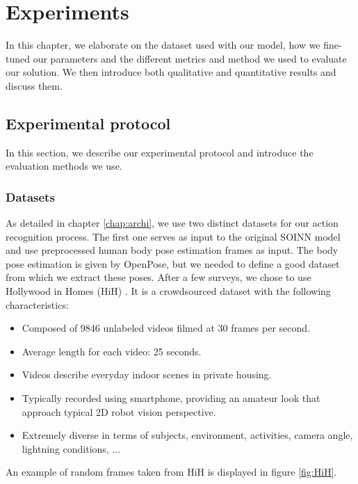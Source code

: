 \chapter{Experiments}
\label{chap:experiments}
In this chapter, we elaborate on the dataset used with our model, how we fine-tuned our parameters and the different metrics and method we used to evaluate our solution. We then introduce both qualitative and quantitative results and discuss them.

\section{Experimental protocol}
\label{section:protocol}
In this section, we describe our experimental protocol and introduce the evaluation methods we use.

\subsection{Datasets}
As detailed in chapter \ref{chap:archi}, we use two distinct datasets for our action recognition process. The first one serves as input to the original SOINN model and use preprocessed human body pose estimation frames as input. The body pose estimation is given by OpenPose, but we needed to define a good dataset from which we extract these poses. After a few surveys, we chose to use Hollywood in Homes (HiH) \cite{HiH}. It is a crowdsourced dataset with the following characteristics:

\begin{itemize}
    \item{Composed of 9846 unlabeled videos filmed at 30 frames per second.}
    \item{Average length for each video: 25 seconds.}
    \item{Videos describe everyday indoor scenes in private housing.}
    \item{Typically recorded using smartphone, providing an amateur look that approach typical 2D robot vision perspective.}
    \item{Extremely diverse in terms of subjects, environment, activities, camera angle, lightning conditions, ...}
\end{itemize}
An example of random frames taken from HiH is displayed in figure \ref{fig:HiH}.

